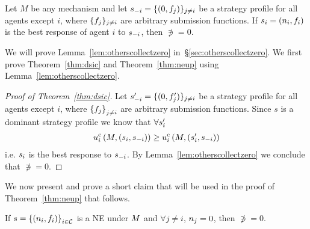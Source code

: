 \begin{lemma}
    \label{lem:otherscollectzero}
        Let $M$ be any mechanism and let
        $s_{-i} = \{(0, f_j)\}_{j\neq i}$ be a strategy profile for all agents except $i$, where
        $\{f_j\}_{j\neq i}$ are arbitrary submission functions.
        If $s_i = (n_i, f_i)$ is the best response of agent $i$ to $s_{-i}$, then $\nni=0$.
\end{lemma}

We will prove Lemma~\ref{lem:otherscollectzero} in~\S\ref{sec:otherscollectzero}.
We first prove Theorem~\ref{thm:dsic} and Theorem~\ref{thm:neup}
using Lemma~\ref{lem:otherscollectzero}.

\begin{proof}[Proof of Theorem~\ref{thm:dsic}]
    Let $s_{-i}' = \{(0, f_j')\}_{j\neq i}$ be a strategy profile for all agents except $i$, where $\left\{f_j\right\}_{j\neq i}$ are arbitrary submission functions. Since $s$ is a dominant strategy profile we know that $\forall s_i'$
    \begin{align*}
        u^{\rm c}_{i}\left(M, \left(s_i, s_{-i}\right)\right)
        \geq 
        u^{\rm c}_{i}\left(M,\left(s_i', s_{-i}\right)\right)
    \end{align*}
    i.e. $s_i$ is the best response to $s_{-i}$. By Lemma~\ref{lem:otherscollectzero} we conclude that $\nni=0$.
\end{proof}

We now present and prove a short claim that will be used in the proof of Theorem~\ref{thm:neup} that follows.

\begin{claim}
    \label{lem:nic-under-single-collector}
    If $s=\left\{(n_i, f_i)\right\}_{i\in\mathcal{C}}$ is a NE under $M$ and $\forall j\neq i$, $n_j=0$, then $\nni=0$.
\end{claim}


